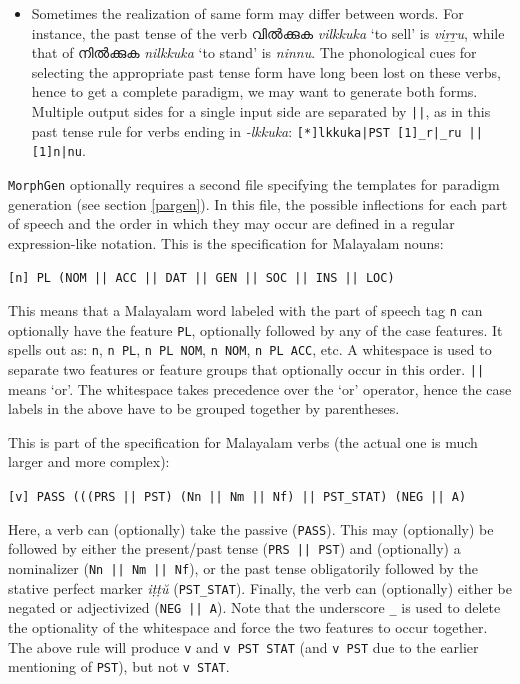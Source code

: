\documentclass[a4paper]{article}
\newcommand{\typ}[1]{\texttt{#1}}
\begin{document}
\begin{itemize}
\item Sometimes the realization of same form may differ between words. For instance, the past tense of the verb വിൽക്കുക \textit{vilkkuka} `to sell' is \textit{viṟṟu}, while that of നിൽക്കുക \textit{nilkkuka} `to stand' is \textit{ninnu}. The phonological cues for selecting the appropriate past tense form have long been lost on these verbs, hence to get a complete paradigm, we may want to generate both forms. Multiple output sides for a single input side are separated by \typ{||}, as in this past tense rule for verbs ending in \textit{-lkkuka}: \typ{[*]lkkuka|PST	[1]\_r|\_ru || [1]n|nu}.
\end{itemize}

\label{parfile}\typ{MorphGen} optionally requires a second file specifying the templates for paradigm generation (see section \ref{pargen}). In this file, the possible inflections for each part of speech and the order in which they may occur are defined in a regular expression-like notation. This is the specification for Malayalam nouns:

\typ{[n] PL (NOM || ACC || DAT || GEN || SOC || INS || LOC)}

This means that a Malayalam word labeled with the part of speech tag \typ{n} can optionally have the feature \typ{PL}, optionally followed by any of the case features. It spells out as: \typ{n}, \typ{n PL}, \typ{n PL NOM}, \typ{n NOM}, \typ{n PL ACC}, etc. A whitespace is used to separate two features or feature groups that optionally occur in this order. \typ{||} means `or'. The whitespace takes precedence over the `or' operator, hence the case labels in the above have to be grouped together by parentheses.

This is part of the specification for Malayalam verbs (the actual one is much larger and more complex):

\typ{[v] PASS (((PRS || PST) (Nn || Nm || Nf) || PST\_STAT) (NEG || A)}

Here, a verb can (optionally) take the passive (\typ{PASS}). This may (optionally) be followed by either the present/past tense (\typ{PRS || PST}) and (optionally) a nominalizer (\typ{Nn || Nm || Nf}), or the past tense obligatorily followed by the stative perfect marker \textit{iṭṭŭ} (\typ{PST\_STAT}). Finally, the verb can (optionally) either be negated or adjectivized (\typ{NEG || A}). Note that the underscore \typ{\_} is used to delete the optionality of the whitespace and force the two features to occur together. The above rule will produce \typ{v} and \typ{v PST STAT} (and \typ{v PST} due to the earlier mentioning of \typ{PST}), but not \typ{v STAT}.
\end{document}

